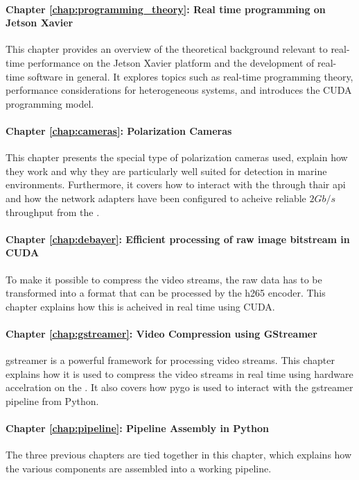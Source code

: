 \paragraph{Chapter \ref{chap:programming_theory}: Real time programming on Jetson Xavier}
This chapter provides an overview of the theoretical background relevant to real-time performance on the Jetson Xavier platform and the development of real-time software in general.
It explores topics such as real-time programming theory, performance considerations for heterogeneous systems, and introduces the CUDA programming model.

\paragraph{Chapter \ref{chap:cameras}: Polarization Cameras}
This chapter presents the special type of polarization cameras used, explain how they work and why they are particularly well suited for detection in marine environments.
Furthermore, it covers how to interact with the \cams through thair \gls{api} and how the network adapters have been configured to acheive reliable $2Gb/s$ throughput from the \cams.

\paragraph{Chapter \ref{chap:debayer}: Efficient processing of raw image bitstream in CUDA}
To make it possible to compress the video streams, the raw data has to be transformed into a format that can be processed by the \gls{h265} encoder.
This chapter explains how this is acheived in real time using CUDA.

\paragraph{Chapter \ref{chap:gstreamer}: Video Compression using GStreamer}
\gls{gstreamer} is a powerful framework for processing video streams.
This chapter explains how it is used to compress the video streams in real time using hardware accelration on the \jx.
It also covers how \gls{pygo} is used to interact with the \gls{gstreamer} pipeline from Python.

\paragraph{Chapter \ref{chap:pipeline}: Pipeline Assembly in Python}
The three previous chapters are tied together in this chapter, which explains how the various components are assembled into a working pipeline.

